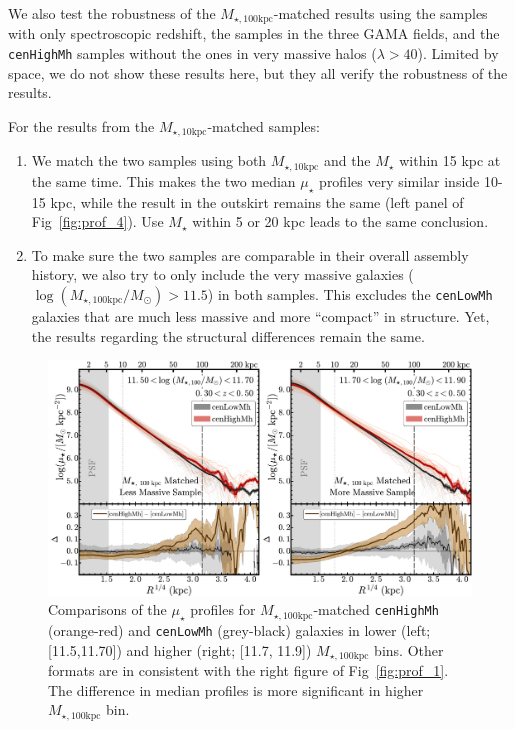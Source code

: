\documentclass[a4paper,fleqn,usenatbib]{mnras}
\def\rbcg{\texttt{cenHighMh}}
\def\nbcg{\texttt{cenLowMh}}
\def\mstar{{$M_{\star}$}}
\def\minn{{$M_{\star,10\mathrm{kpc}}$}}
\def\mtot{{$M_{\star,100\mathrm{kpc}}$}}
\def\logmtot{{$\log (M_{\star,100\mathrm{kpc}}/M_{\odot})$}}
\def\mden{{$\mu_{\star}$}}
\begin{document}
    We also test the robustness of the \mtot{}-matched results using the samples with 
    only spectroscopic redshift, the samples in the three GAMA fields, and the \rbcg{} 
    samples without the ones in very massive halos ($\lambda > 40$).  
    Limited by space, we do not show these results here, but they all verify the 
    robustness of the results. 
    
    For the results from the \minn{}-matched samples: 
    
    \begin{enumerate}
    
        \item
            We match the two samples using both \minn{} and the \mstar{} within 15 kpc 
            at the same time.  
            This makes the two median \mden{} profiles very similar inside 10-15 
            kpc, while the result in the outskirt remains the same (left panel of 
            Fig~\ref{fig:prof_4}).
            Use \mstar{} within 5 or 20 kpc leads to the same conclusion. 
          
        \item 
            To make sure the two samples are comparable in their overall assembly history,
            we also try to only include the very massive galaxies (\logmtot{}$>11.5$)
            in both samples. 
            This excludes the \nbcg{} galaxies that are much less massive and 
            more ``compact'' in structure. 
            Yet, the results regarding the structural differences remain the same. 
          
    \end{enumerate}

  \begin{figure}
      \centering 
      \includegraphics[width=\textwidth]{fig/redbcg_prof_2}
      \caption{
          Comparisons of the \mden{} profiles for \mtot{}-matched \rbcg{} 
          (orange-red) and \nbcg{} (grey-black) galaxies in lower (left; [11.5,11.70]) 
          and higher (right; [11.7, 11.9]) \mtot{} bins. 
          Other formats are in consistent with the right figure of Fig~\ref{fig:prof_1}.
          The difference in median profiles is more significant in higher \mtot{} bin.
          }
      \label{fig:prof_2}
  \end{figure}
\end{document}
